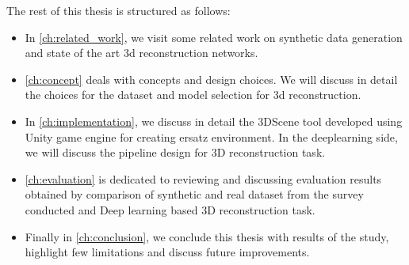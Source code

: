 The rest of this thesis is structured as follows:

\begin{itemize}
    \item In \autoref{ch:related_work}, we visit some related work on synthetic data generation and state of the art 3d reconstruction networks.
    \item \autoref{ch:concept} deals with concepts and design choices.
    We will discuss in detail the choices for the dataset and model selection for 3d reconstruction.
    \item In \autoref{ch:implementation}, we discuss in detail the 3DScene tool developed using Unity game engine for creating ersatz environment.
    In the deeplearning side, we will discuss the pipeline design for 3D reconstruction task.
    \item \autoref{ch:evaluation} is dedicated to reviewing and discussing evaluation results obtained by comparison of synthetic and real dataset from the survey conducted and Deep learning based 3D reconstruction task.
    \item Finally in \autoref{ch:conclusion}, we conclude this thesis with results of the study, highlight few limitations and discuss future improvements.
\end{itemize}